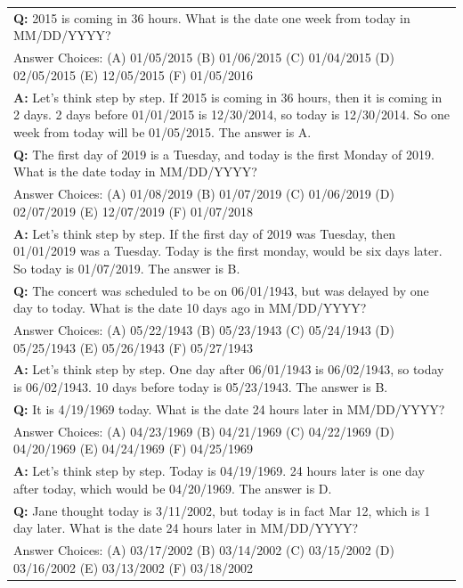 \documentclass[11pt]{article}
\begin{document}
\begin{table}[ht]
    \centering
    \begin{tabularx}{\textwidth}{X}
    \toprule 
    \textbf{Q: }2015 is coming in 36 hours. What is the date one week from today in MM/DD/YYYY? \\
    Answer Choices: (A) 01/05/2015 (B) 01/06/2015 (C) 01/04/2015 (D) 02/05/2015 (E) 12/05/2015 (F) 01/05/2016 \\
    \textbf{A: } Let's think step by step. If 2015 is coming in 36 hours, then it is coming in 2 days. 2 days before 01/01/2015 is 12/30/2014, so today is 12/30/2014. So one week from today will be 01/05/2015. The answer is A. \\
    \hdashline 
    \textbf{Q: }The first day of 2019 is a Tuesday, and today is the first Monday of 2019. What is the date today in MM/DD/YYYY? \\
    Answer Choices: (A) 01/08/2019 (B) 01/07/2019 (C) 01/06/2019 (D) 02/07/2019 (E) 12/07/2019 (F) 01/07/2018 \\
    \textbf{A: } Let's think step by step. If the first day of 2019 was Tuesday, then 01/01/2019 was a Tuesday. Today is the first monday, would be six days later. So today is 01/07/2019. The answer is B.\\
    \hdashline
    \textbf{Q: }The concert was scheduled to be on 06/01/1943, but was delayed by one day to today. What is the date 10 days ago in MM/DD/YYYY? \\
    Answer Choices: (A) 05/22/1943 (B) 05/23/1943 (C) 05/24/1943 (D) 05/25/1943 (E) 05/26/1943 (F) 05/27/1943 \\
    \textbf{A: }Let's think step by step. One day after 06/01/1943 is 06/02/1943, so today is 06/02/1943. 10 days before today is 05/23/1943. The answer is B.\\
    \hdashline
    \textbf{Q: }It is 4/19/1969 today. What is the date 24 hours later in MM/DD/YYYY? \\ Answer Choices: (A) 04/23/1969 (B) 04/21/1969 (C) 04/22/1969 (D) 04/20/1969 (E) 04/24/1969 (F) 04/25/1969 \\
    \textbf{A: }Let's think step by step. Today is 04/19/1969. 24 hours later is one day after today, which would be 04/20/1969. The answer is D.\\
    \hdashline
    \textbf{Q: }Jane thought today is 3/11/2002, but today is in fact Mar 12, which is 1 day later. What is the date 24 hours later in MM/DD/YYYY? \\
    Answer Choices: (A) 03/17/2002 (B) 03/14/2002 (C) 03/15/2002 (D) 03/16/2002 (E) 03/13/2002 (F) 03/18/2002 \\

\end{tabularx}
\end{table}
\end{document}
